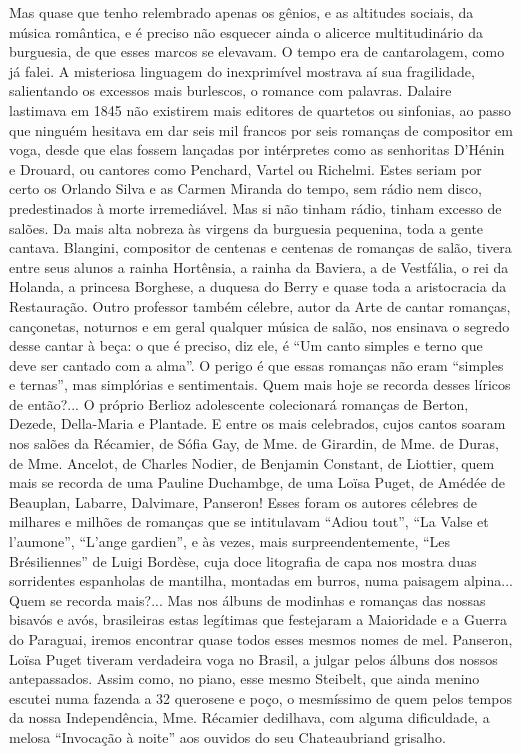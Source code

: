Mas quase que tenho relembrado apenas os gênios, e as altitudes sociais,
da música romântica, e é preciso não esquecer ainda o alicerce
multitudinário da burguesia, de que esses marcos se elevavam. O tempo
era de cantarolagem, como já falei. A misteriosa linguagem do
inexprimível mostrava aí sua fragilidade, salientando os excessos mais
burlescos, o romance com palavras. Dalaire lastimava em 1845 não
existirem mais editores de quartetos ou sinfonias, ao passo que ninguém
hesitava em dar seis mil francos por seis romanças de compositor em
voga, desde que elas fossem lançadas por intérpretes como as senhoritas
D'Hénin e Drouard, ou cantores como Penchard, Vartel ou Richelmi. Estes
seriam por certo os Orlando Silva e as Carmen Miranda do tempo, sem
rádio nem disco, predestinados à morte irremediável. Mas si não tinham
rádio, tinham excesso de salões. Da mais alta nobreza às virgens da
burguesia pequenina, toda a gente cantava. Blangini, compositor de
centenas e centenas de romanças de salão, tivera entre seus alunos a
rainha Hortênsia, a rainha da Baviera, a de Vestfália, o rei da Holanda,
a princesa Borghese, a duquesa do Berry e quase toda a aristocracia da
Restauração. Outro professor também célebre, autor da Arte de cantar
romanças, cançonetas, noturnos e em geral qualquer música de salão, nos
ensinava o segredo desse cantar à beça: o que é preciso, diz ele, é ``Um
canto simples e terno que deve ser cantado com a alma''. O perigo é que
essas romanças não eram ``simples e ternas'', mas simplórias e
sentimentais. Quem mais hoje se recorda desses líricos de então?... O
próprio Berlioz adolescente colecionará romanças de Berton, Dezede,
Della-Maria e Plantade. E entre os mais celebrados, cujos cantos soaram
nos salões da Récamier, de Sófia Gay, de Mme. de Girardin, de Mme. de
Duras, de Mme. Ancelot, de Charles Nodier, de Benjamin Constant, de
Liottier, quem mais se recorda de uma Pauline Duchambge, de uma Loïsa
Puget, de Amédée de Beauplan, Labarre, Dalvimare, Panseron! Esses foram
os autores célebres de milhares e milhões de romanças que se intitulavam
``Adiou tout'', ``La Valse et l'aumone'', ``L'ange gardien'', e às
vezes, mais surpreendentemente, ``Les Brésiliennes'' de Luigi Bordèse,
cuja doce litografia de capa nos mostra duas sorridentes espanholas de
mantilha, montadas em burros, numa paisagem alpina... Quem se recorda
mais?... Mas nos álbuns de modinhas e romanças das nossas bisavós e
avós, brasileiras estas legítimas que festejaram a Maioridade e a Guerra
do Paraguai, iremos encontrar quase todos esses mesmos nomes de mel.
Panseron, Loïsa Puget tiveram verdadeira voga no Brasil, a julgar pelos
álbuns dos nossos antepassados. Assim como, no piano, esse mesmo
Steibelt, que ainda menino escutei numa fazenda a 32 querosene e poço, o
mesmíssimo de quem pelos tempos da nossa Independência, Mme. Récamier
dedilhava, com alguma dificuldade, a melosa ``Invocação à noite'' aos
ouvidos do seu Chateaubriand grisalho.

